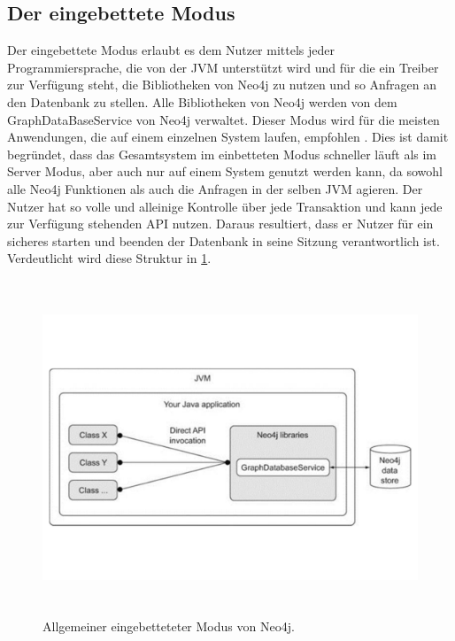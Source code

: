 \subsection{Der eingebettete Modus}
Der eingebettete Modus erlaubt es dem Nutzer mittels jeder Programmiersprache, die von der JVM unterstützt wird und für die ein Treiber zur Verfügung steht, die Bibliotheken von Neo4j zu nutzen und so Anfragen an den Datenbank zu stellen. Alle Bibliotheken von Neo4j werden von dem GraphDataBaseService von Neo4j verwaltet. Dieser Modus wird für die meisten Anwendungen, die auf einem einzelnen System laufen, empfohlen \parencite{raj2015neo4j}. Dies ist damit begründet, dass das Gesamtsystem im einbetteten Modus schneller läuft als im Server Modus, aber auch nur auf einem System genutzt werden kann, da sowohl alle Neo4j Funktionen als auch die Anfragen in der selben JVM agieren. Der Nutzer hat so volle und alleinige Kontrolle über jede Transaktion und kann jede zur Verfügung stehenden  API nutzen. Daraus resultiert, dass er Nutzer für ein sicheres starten und beenden der Datenbank in seine Sitzung verantwortlich ist\parencite{robinson2013graph}.  Verdeutlicht wird diese Struktur in \ref{fig:Embedded}.
\begin{figure}[!htb]
	\centering
	\includegraphics [width=12cm, height=10cm]{Figures/Embedded}
	\caption[Eingebettet]{Allgemeiner eingebetteteter Modus von Neo4j.}
	\label{fig:Embedded}
	\FloatBarrier
\end{figure}

